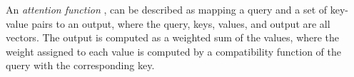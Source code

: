 \documentclass{article}
\begin{document}
	
	An \textit{attention function} \cite{vaswani2017attention}, can be described as mapping a query and 
	a set of key-value pairs to an output, where the query, keys, values, and output are all vectors. The 
	output is computed as a weighted sum of the values, where the weight assigned to each value is 
	computed by a compatibility function of the query with the corresponding key.
	
\end{document}
